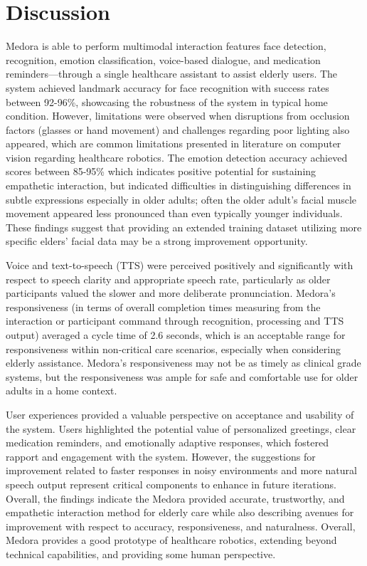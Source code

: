 \section{Discussion}
 Medora is able to perform multimodal interaction features face detection, recognition, emotion classification, voice-based dialogue, and medication reminders—through a single healthcare assistant to assist elderly users. The system achieved landmark accuracy for face recognition with success rates between 92-96\%, showcasing the robustness of the system in typical home condition. However, limitations were observed when disruptions from occlusion factors (glasses or hand movement) and challenges regarding poor lighting also appeared, which are common limitations presented in literature on computer vision regarding healthcare robotics. The emotion detection accuracy achieved scores between 85-95\% which indicates positive potential for sustaining empathetic interaction, but indicated difficulties in distinguishing differences in subtle expressions especially in older adults; often the older adult's facial muscle movement appeared less pronounced than even typically younger individuals. These findings suggest that providing an extended training dataset utilizing more specific elders' facial data may be a strong improvement opportunity.


 Voice and text-to-speech (TTS) were perceived positively and significantly with respect to speech clarity and appropriate speech rate, particularly as older participants valued the slower and more deliberate pronunciation.  Medora's responsiveness (in terms of overall completion times measuring from the interaction or participant command through recognition, processing and TTS output) averaged a cycle time of 2.6 seconds, which is an acceptable range for responsiveness within non-critical care scenarios, especially when considering elderly assistance. Medora's responsiveness may not be as timely as clinical grade systems, but the responsiveness was ample for safe and comfortable use for older adults in a home context.

 User experiences provided a valuable perspective on acceptance and usability of the system. Users highlighted the potential value of personalized greetings, clear medication reminders, and emotionally adaptive responses, which fostered rapport and engagement with the system. However, the suggestions for improvement related to faster responses in noisy environments and more natural speech output represent critical components to enhance in future iterations. Overall, the findings indicate the Medora provided accurate, trustworthy, and empathetic interaction method for elderly care while also describing avenues for improvement with respect to accuracy, responsiveness, and naturalness. Overall, Medora provides a good prototype of healthcare robotics, extending beyond technical capabilities, and providing some human perspective.

